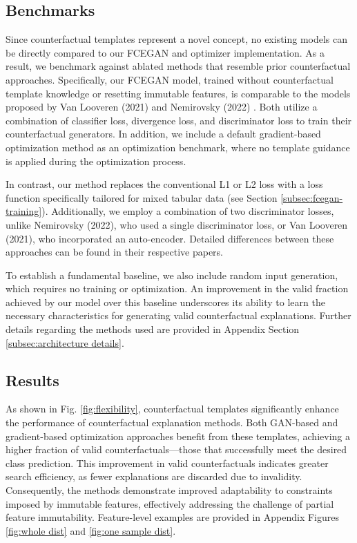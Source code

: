 \documentclass[runningheads]{llncs}
\begin{document}
\subsection{Benchmarks}  
Since counterfactual templates represent a novel concept, no existing models can be directly compared to our FCEGAN and optimizer implementation. As a result, we benchmark against ablated methods that resemble prior counterfactual approaches. Specifically, our FCEGAN model, trained without counterfactual template knowledge or resetting immutable features, is comparable to the models proposed by Van Looveren (2021) \cite{vanlooveren_2021_conditional} and Nemirovsky (2022) \cite{nemirovsky_2022_countergan}. Both utilize a combination of classifier loss, divergence loss, and discriminator loss to train their counterfactual generators. In addition, we include a default gradient-based optimization method as an optimization benchmark, where no template guidance is applied during the optimization process.

In contrast, our method replaces the conventional L1 or L2 loss with a loss function specifically tailored for mixed tabular data (see Section \ref{subsec:fcegan-training}). Additionally, we employ a combination of two discriminator losses, unlike Nemirovsky (2022), who used a single discriminator loss, or Van Looveren (2021), who incorporated an auto-encoder. Detailed differences between these approaches can be found in their respective papers.

To establish a fundamental baseline, we also include random input generation, which requires no training or optimization. An improvement in the valid fraction achieved by our model over this baseline underscores its ability to learn the necessary characteristics for generating valid counterfactual explanations. Further details regarding the methods used are provided in Appendix Section \ref{subsec:architecture details}.

\subsection{Results}
As shown in Fig. \ref{fig:flexibility}, counterfactual templates significantly enhance the performance of counterfactual explanation methods. Both GAN-based and gradient-based optimization approaches benefit from these templates, achieving a higher fraction of valid counterfactuals—those that successfully meet the desired class prediction. This improvement in valid counterfactuals indicates greater search efficiency, as fewer explanations are discarded due to invalidity. Consequently, the methods demonstrate improved adaptability to constraints imposed by immutable features, effectively addressing the challenge of partial feature immutability. Feature-level examples are provided in Appendix Figures \ref{fig:whole dist} and \ref{fig:one sample dist}.
\end{document}
